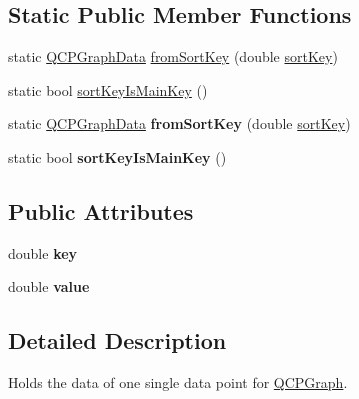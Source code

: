 \subsection*{Static Public Member Functions}
\begin{DoxyCompactItemize}
\item 
static \hyperlink{class_q_c_p_graph_data}{Q\+C\+P\+Graph\+Data} \hyperlink{class_q_c_p_graph_data_a4646eac7f7a48970ea0fc5153aab0e77}{from\+Sort\+Key} (double \hyperlink{class_q_c_p_graph_data_aae097cdf07f2c31edbbc7931e1e2e47f}{sort\+Key})
\item 
static bool \hyperlink{class_q_c_p_graph_data_a1c98dfd21b82321a173db4ff860dfd21}{sort\+Key\+Is\+Main\+Key} ()
\item 
static \hyperlink{class_q_c_p_graph_data}{Q\+C\+P\+Graph\+Data} {\bfseries from\+Sort\+Key} (double \hyperlink{class_q_c_p_graph_data_aae097cdf07f2c31edbbc7931e1e2e47f}{sort\+Key})\hypertarget{class_q_c_p_graph_data_a4646eac7f7a48970ea0fc5153aab0e77}{}\label{class_q_c_p_graph_data_a4646eac7f7a48970ea0fc5153aab0e77}

\item 
static bool {\bfseries sort\+Key\+Is\+Main\+Key} ()\hypertarget{class_q_c_p_graph_data_a61da5d975de269a23d98ad18bc4f4ab3}{}\label{class_q_c_p_graph_data_a61da5d975de269a23d98ad18bc4f4ab3}

\end{DoxyCompactItemize}
\subsection*{Public Attributes}
\begin{DoxyCompactItemize}
\item 
double {\bfseries key}\hypertarget{class_q_c_p_graph_data_a2fcebdf84af975761c0661237d7e28ec}{}\label{class_q_c_p_graph_data_a2fcebdf84af975761c0661237d7e28ec}

\item 
double {\bfseries value}\hypertarget{class_q_c_p_graph_data_ac97e3ddbdcbe0b58d0b4d6f95250d59c}{}\label{class_q_c_p_graph_data_ac97e3ddbdcbe0b58d0b4d6f95250d59c}

\end{DoxyCompactItemize}


\subsection{Detailed Description}
Holds the data of one single data point for \hyperlink{class_q_c_p_graph}{Q\+C\+P\+Graph}. 

